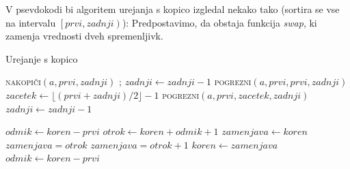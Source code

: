 \documentclass[a4paper,oneside]{article}
\begin{document}
V psevdokodi bi algoritem urejanja s kopico izgledal nekako tako (sortira se vse na intervalu
$\left[prvi, zadnji\right)$):
Predpostavimo, da obstaja funkcija \emph{swap}, ki zamenja vrednosti dveh spremenljivk.

\begin{algorithm}
  \caption{Urejanje s kopico}\label{algo:heapsort}
  \begin{algorithmic}[1]
        \State \textsc{nakopiči}$(a, prvi, zadnji)$
            ;
            \State $zadnji \gets zadnji - 1$
            \State \textsc{pogrezni}$(a, prvi, prvi, zadnji)$
        \EndWhile
    \EndFunction
        \State $zacetek \gets \lfloor(prvi + zadnji) / 2\rfloor - 1$
         
            \State \textsc{pogrezni}$(a, prvi, zacetek, zadnji)$
            \State $zadnji \gets zadnji - 1$
        \EndWhile
    \EndFunction
  \end{algorithmic}
\end{algorithm}
\begin{algorithm}
  \begin{algorithmic}[1]
        \State $odmik \gets koren - prvi$
         
            \State $otrok \gets koren + odmik + 1$
            \State $zamenjava \gets koren$ 
             
            \State $zamenjava = otrok$
            \EndIf {}
                \State $zamenjava = otrok + 1$
            \EndIf
                \State $koren \gets zamenjava$
            \Else \Return 
            \State $odmik \gets koren - prvi$
            \EndIf
        \EndWhile
    \EndFunction
  \end{algorithmic}
\end{algorithm}
\end{document}
